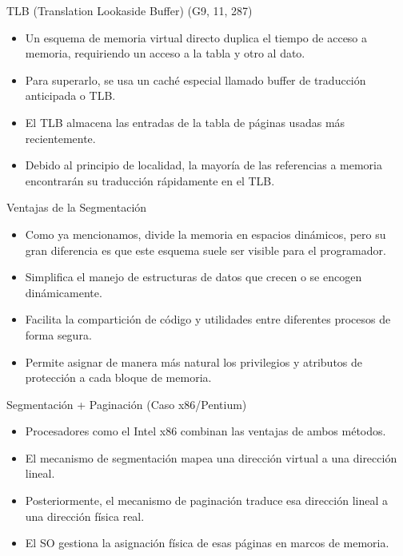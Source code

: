 \documentclass[presentation]{beamer}
\begin{document}
\begin{frame}[label={sec:orgba31f1c}]{TLB (Translation Lookaside Buffer) (G9, 11, 287)}
\begin{itemize}
\item Un esquema de memoria virtual directo duplica el tiempo de acceso a memoria, requiriendo un acceso a la tabla y otro al dato.
\item Para superarlo, se usa un caché especial llamado buffer de traducción anticipada o TLB.
\item El TLB almacena las entradas de la tabla de páginas usadas más recientemente.
\item Debido al principio de localidad, la mayoría de las referencias a memoria encontrarán su traducción rápidamente en el TLB.
\end{itemize}
\end{frame}

\begin{frame}[label={sec:orgd87c6a9}]{Ventajas de la Segmentación}
\begin{itemize}
\item Como ya mencionamos, divide la memoria en espacios dinámicos, pero su gran diferencia es que este esquema suele ser visible para el programador.
\item Simplifica el manejo de estructuras de datos que crecen o se encogen dinámicamente.
\item Facilita la compartición de código y utilidades entre diferentes procesos de forma segura.
\item Permite asignar de manera más natural los privilegios y atributos de protección a cada bloque de memoria.
\end{itemize}
\end{frame}

\begin{frame}[label={sec:org555d094}]{Segmentación + Paginación (Caso x86/Pentium)}
\begin{itemize}
\item Procesadores como el Intel x86 combinan las ventajas de ambos métodos.
\item El mecanismo de segmentación mapea una dirección virtual a una dirección lineal.
\item Posteriormente, el mecanismo de paginación traduce esa dirección lineal a una dirección física real.
\item El SO gestiona la asignación física de esas páginas en marcos de memoria.
\end{itemize}
\end{frame}
\end{document}
